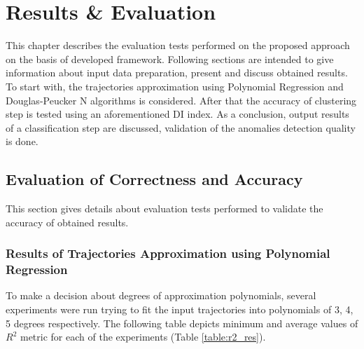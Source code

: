 \chapter{Results \& Evaluation}
\label{ch:Results and Evaluation}

This chapter describes the evaluation tests performed on the proposed approach on the basis of developed framework. Following sections are intended to give information about input data preparation, present and discuss obtained results. To start with, the trajectories approximation using Polynomial Regression and Douglas-Peucker N algorithms is considered. After that the accuracy of clustering step is tested using an aforementioned DI index. As a conclusion, output results of a classification step are discussed, validation of the anomalies detection quality is done.

\section{Evaluation of Correctness and Accuracy}

This section gives details about evaluation tests performed to validate the accuracy of obtained results.

\subsection{Results of Trajectories Approximation using Polynomial Regression}

To make a decision about degrees of approximation polynomials, several experiments were run trying to fit the input trajectories into polynomials of 3, 4, 5 degrees respectively. The following table depicts minimum and average values of $R^2$ metric for each of the experiments (Table \ref{table:r2_res}). 

